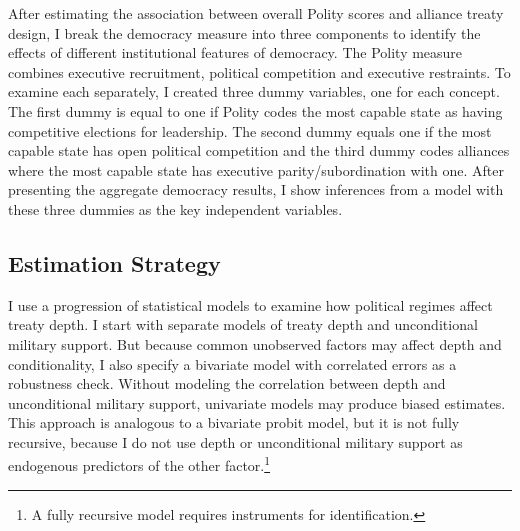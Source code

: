 \documentclass[12pt]{article}
\begin{document}
After estimating the association between overall Polity scores and alliance treaty design, I break the democracy measure into three components to identify the effects of different institutional features of democracy.  
The Polity measure combines executive recruitment, political competition and executive restraints. 
To examine each separately, I created three dummy variables, one for each concept. 
The first dummy is equal to one if Polity codes the most capable state as having competitive elections for leadership.
The second dummy equals one if the most capable state has open political competition and the third dummy codes alliances where the most capable state has executive parity/subordination with one. 
After presenting the aggregate democracy results, I show inferences from a model with these three dummies as the key independent variables.



\subsection{Estimation Strategy}



I use a progression of statistical models to examine how political regimes affect treaty depth. 
I start with separate models of treaty depth and unconditional military support. 
But because common unobserved factors may affect depth and conditionality, I also specify a bivariate model with correlated errors as a robustness check. 
Without modeling the correlation between depth and unconditional military support, univariate models may produce biased estimates. 
This approach is analogous to a bivariate probit model, but it is not fully recursive, because I do not use depth or unconditional military support as endogenous predictors of the other factor.\footnote{A fully recursive model requires instruments for identification.}  
\end{document}
